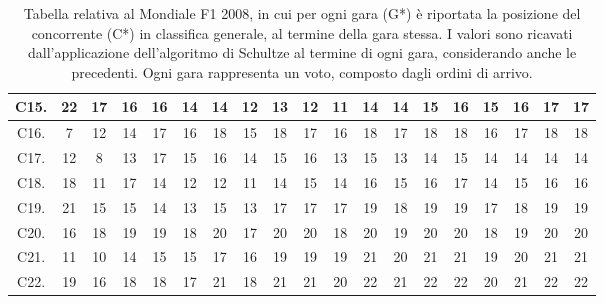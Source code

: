 \documentclass[12pt,a4paper,openright,twoside]{book}
\begin{document}
\begin{table}[H]
{\begin{tabular}{|c|c|c|c|c|c|c|c|c|c|c|c|c|c|c|c|c|c|c|}
    C15.  & 22 & 17 & 16 & 16 & 14 & 14 & 12 & 13 & 12 & 11 & 14 & 14 & 15 & 16 & 15 & 16 & 17 & 17 \\ \hline
    C16.  & 7 & 12 & 14 & 17 & 16 & 18 & 15 & 18 & 17 & 16 & 18 & 17 & 18 & 18 & 16 & 17 & 18 & 18 \\ \hline
    C17.  & 12 & 8 & 13 & 17 & 15 & 16 & 14 & 15 & 16 & 13 & 15 & 13 & 14 & 15 & 14 & 14 & 14 & 14 \\ \hline
    C18.  & 18 & 11 & 17 & 14 & 12 & 12 & 11 & 14 & 15 & 14 & 16 & 15 & 16 & 17 & 14 & 15 & 16 & 16 \\ \hline
    C19.  & 21 & 15 & 15 & 14 & 13 & 15 & 13 & 17 & 17 & 17 & 19 & 18 & 19 & 19 & 17 & 18 & 19 & 19 \\ \hline
    C20. & 16 & 18 & 19 & 19 & 18 & 20 & 17 & 20 & 20 & 18 & 20 & 19 & 20 & 20 & 18 & 19 & 20 & 20 \\ \hline
    C21.  & 11 & 10 & 14 & 15 & 15 & 17 & 16 & 19 & 19 & 19 & 21 & 20 & 21 & 21 & 19 & 20 & 21 & 21 \\ \hline
    C22.  & 19 & 16 & 18 & 18 & 17 & 21 & 18 & 21 & 21 & 20 & 22 & 21 & 22 & 22 & 20 & 21 & 22 & 22 \\ \hline
    \end{tabular}}
    \endgroup
    \caption{Tabella relativa al Mondiale F1 2008, in cui per ogni gara (G*)  è riportata la posizione del concorrente (C*) in classifica generale, al termine della gara stessa.
    I valori sono ricavati dall'applicazione dell'algoritmo di Schultze al termine di ogni gara, considerando anche le precedenti.
    Ogni gara rappresenta un voto, composto dagli ordini di arrivo.
    }
    \label{table:classifichegeneralischultze2008tabella}
\end{table}
\end{document}
